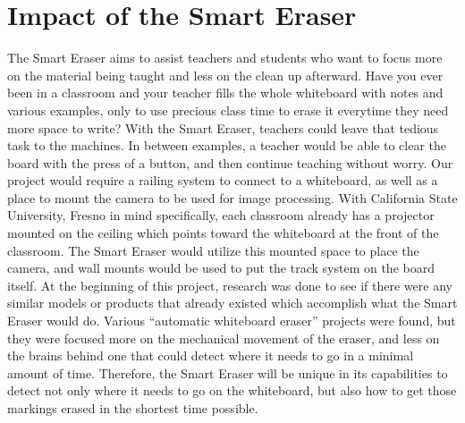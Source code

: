 \documentclass{IEEEtran}					%
\begin{document}
	\section{Impact of the Smart Eraser}
	\setlength{\parindent}{5ex}
	The Smart Eraser aims to assist teachers and students who want to focus more on the material being taught and less on the clean up afterward. Have you ever been in a classroom and your teacher fills the whole whiteboard with notes and various examples, only to use precious class time to erase it everytime they need more space to write? With the Smart Eraser, teachers could leave that tedious task to the machines. In between examples, a teacher would be able to clear the board with the press of a button, and then continue teaching without worry.
	\setlength{\parindent}{5ex}
	Our project would require a railing system to connect to a whiteboard, as well as a place to mount the camera to be used for image processing. With California State University, Fresno in mind specifically, each classroom already has a projector mounted on the ceiling which points toward the whiteboard at the front of the classroom. The Smart Eraser would utilize this mounted space to place the camera, and wall mounts would be used to put the track system on the board itself.
	\setlength{\parindent}{5ex}
	At the beginning of this project, research was done to see if there were any similar models or products that already existed which accomplish what the Smart Eraser would do. Various “automatic whiteboard eraser” projects were found, but they were focused more on the mechanical movement of the eraser, and less on the brains behind one that could detect where it needs to go in a minimal amount of time. Therefore, the Smart Eraser will be unique in its capabilities to detect not only where it needs to go on the whiteboard, but also how to get those markings erased in the shortest time possible.
	
\end{document}
